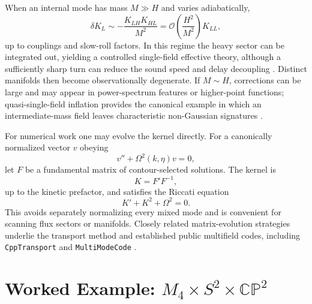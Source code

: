 \documentclass[11pt,a4paper]{article}
\newcommand{\CP}{\mathbb{CP}}
\begin{document}
When an internal mode has mass $M\gg H$ and varies adiabatically,
\begin{equation}
\delta K_L\sim-\frac{K_{LH}K_{HL}}{M^2}
=\mathcal O\left(\frac{H^2}{M^2}\right)K_{LL},
\end{equation}
up to couplings and slow-roll factors. In this regime the heavy sector can be integrated out, yielding a controlled single-field effective theory, although a sufficiently sharp turn can reduce the sound speed and delay decoupling \cite{AchucarroEtAl2012EFT,CespedesAtalPalma2012}. Distinct manifolds then become observationally degenerate. If $M\sim H$, corrections can be large and may appear in power-spectrum features or higher-point functions; quasi-single-field inflation provides the canonical example in which an intermediate-mass field leaves characteristic non-Gaussian signatures \cite{ChenWang2010,ArkaniHamedMaldacena2015}.

For numerical work one may evolve the kernel directly. For a canonically normalized vector $v$ obeying
\begin{equation}
v''+\Omega^2(k,\eta)v=0,
\end{equation}
let $F$ be a fundamental matrix of contour-selected solutions. The kernel is
\begin{equation}
K=F'F^{-1},
\end{equation}
up to the kinetic prefactor, and satisfies the Riccati equation
\begin{equation}
K'+K^2+\Omega^2=0.
\label{eq:riccati}
\end{equation}
This avoids separately normalizing every mixed mode and is convenient for scanning flux sectors or manifolds. Closely related matrix-evolution strategies underlie the transport method and established public multifield codes, including \texttt{CppTransport} and \texttt{MultiModeCode} \cite{DiasFrazerSeery2015,Seery2016,PriceEtAl2015}.

\section{Worked Example: $M_4\times S^2\times\CP^2$}
\label{sec:s2cp2}
\end{document}

